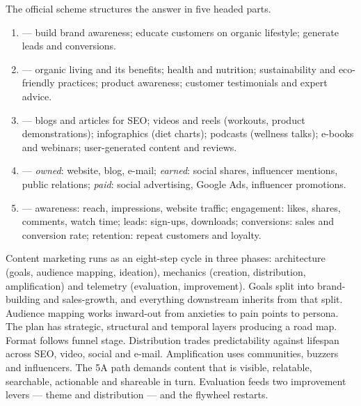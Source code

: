 \documentclass{MMTextbook}
\begin{document}
\begin{exambox}
The official scheme structures the answer in five headed parts.

\begin{enumerate}
\item {} --- build brand awareness; educate customers on organic
      lifestyle; generate leads and conversions.
\item {} --- organic living and its benefits; health and
      nutrition; sustainability and eco-friendly practices; product awareness;
      customer testimonials and expert advice.
\item {} --- blogs and articles for SEO; videos and reels
      (workouts, product demonstrations); infographics (diet charts); podcasts
      (wellness talks); e-books and webinars; user-generated content and
      reviews.
\item {} --- \emph{owned}: website, blog, e-mail;
      \emph{earned}: social shares, influencer mentions, public relations;
      \emph{paid}: social advertising, Google Ads, influencer promotions.
\item {} --- awareness: reach, impressions, website traffic;
      engagement: likes, shares, comments, watch time; leads: sign-ups,
      downloads; conversions: sales and conversion rate; retention: repeat
      customers and loyalty.
\end{enumerate}
\end{exambox}

\begin{summarybox}
Content marketing runs as an eight-step cycle in three phases: architecture
(goals, audience mapping, ideation), mechanics (creation, distribution,
amplification) and telemetry (evaluation, improvement). Goals split into
brand-building and sales-growth, and everything downstream inherits from that
split. Audience mapping works inward-out from anxieties to pain points to
persona. The plan has strategic, structural and temporal layers producing a road
map. Format follows funnel stage. Distribution trades predictability against
lifespan across SEO, video, social and e-mail. Amplification uses communities,
buzzers and influencers. The 5A path demands content that is visible, relatable,
searchable, actionable and shareable in turn. Evaluation feeds two improvement
levers --- theme and distribution --- and the flywheel restarts.
\end{summarybox}
\end{document}
